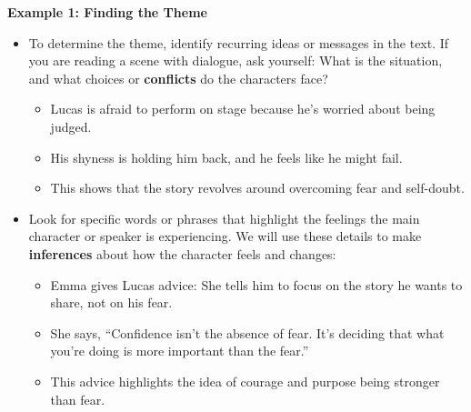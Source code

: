 \documentclass[12pt]{article}
\begin{document}
\begin{tcolorbox}[colframe=black!60, colback=white, 
coltitle=black, colbacktitle=black!15, fonttitle=\bfseries\Large, 
title=Examples, halign title=center, left=10pt, right=10pt, top=10pt, bottom=15pt]

\textbf{Example 1: Finding the Theme}  
\begin{itemize}
    \item To determine the theme, identify recurring ideas or messages in the text. If you are reading a scene with dialogue, ask yourself: What is the situation, and what choices or \textbf{conflicts} do the characters face?  
   


    \begin{itemize}
        \item Lucas is afraid to perform on stage because he’s worried about being judged.
    \end{itemize}
    \begin{itemize}
        \item His shyness is holding him back, and he feels like he might fail.
    \end{itemize}
    \begin{itemize}
        \item This shows that the story revolves around overcoming fear and self-doubt.
    \end{itemize}
   

    \item Look for specific words or phrases that highlight the feelings the main character or speaker is experiencing. We will use these details to make \textbf{inferences} about how the character feels and changes:


    \begin{itemize}
        \item Emma gives Lucas advice: She tells him to focus on the story he wants to share, not on his fear.
    \end{itemize}
    \begin{itemize}
        \item She says, “Confidence isn’t the absence of fear. It’s deciding that what you’re doing is more important than the fear.”
    \end{itemize}

\begin{itemize}
    \item This advice highlights the idea of courage and purpose being stronger than fear.
\end{itemize}


\end{itemize}
\end{tcolorbox}
\end{document}

